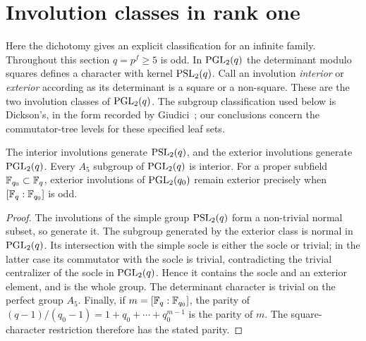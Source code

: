 \section{Involution classes in rank one}
\label{sec:rankone}

Here the dichotomy gives an explicit classification for an infinite family.
Throughout this section $q=p^f\ge5$ is odd. In $\operatorname{PGL}_2(q)$ the determinant modulo
squares defines a character with kernel $\operatorname{PSL}_2(q)$. Call an involution
\emph{interior} or \emph{exterior} according as its determinant is a square or a
non-square. These are the two involution classes of $\operatorname{PGL}_2(q)$.
The subgroup classification used below is Dickson's, in the form recorded by
Giudici~\cite[Theorems 2.2 and 3.5]{Giudici2007}; our conclusions concern the
commutator-tree levels for these specified leaf sets.

\begin{lemma}
\label{lem:rankone-inputs}
The interior involutions generate $\operatorname{PSL}_2(q)$, and the exterior involutions
generate $\operatorname{PGL}_2(q)$. Every $A_5$ subgroup of $\operatorname{PGL}_2(q)$ is interior.
For a proper subfield $\mathbb{F}_{q_0}\subset\mathbb{F}_q$, exterior involutions of
$\operatorname{PGL}_2(q_0)$ remain exterior precisely when $[\mathbb{F}_q:\mathbb{F}_{q_0}]$ is odd.
\end{lemma}
\begin{proof}
The involutions of the simple group $\operatorname{PSL}_2(q)$ form a non-trivial normal
subset, so generate it. The subgroup generated by the exterior class is
normal in $\operatorname{PGL}_2(q)$. Its intersection with the simple socle is either the
socle or trivial; in the latter case its commutator with the socle is trivial,
contradicting the trivial centralizer of the socle in $\operatorname{PGL}_2(q)$. Hence it
contains the socle and an exterior element, and is the whole group.
The determinant character is trivial on the perfect group $A_5$.
Finally, if $m=[\mathbb{F}_q:\mathbb{F}_{q_0}]$, the parity of
$(q-1)/(q_0-1)=1+q_0+\cdots+q_0^{m-1}$ is the parity of $m$.
The square-character restriction therefore has the stated parity.
\end{proof}

